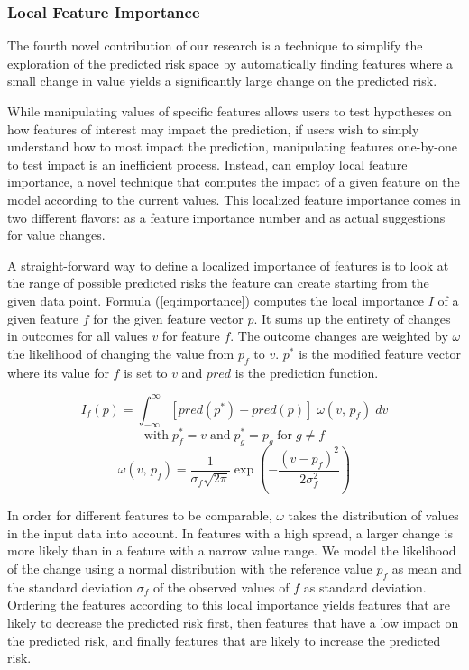 \subsubsection{Local Feature Importance}
The fourth novel contribution of our research is a technique to simplify the
exploration of the predicted risk space by automatically finding features where a small change in value yields a significantly large change on the predicted risk.

While manipulating values of specific features allows users to test hypotheses on how features of interest may impact the prediction, if users wish to simply understand how to most impact the prediction, manipulating features one-by-one to test impact is an inefficient process.  Instead, \prospector can employ local feature importance, a novel technique that computes the impact of a given feature on the model according to the current values.  This localized feature importance comes in two different flavors: as a feature importance number and as actual suggestions for value changes.

A straight-forward way to define a localized importance of features is to look at the range of possible
predicted risks the feature can create starting from the given data point.
Formula (\ref{eq:importance}) computes the local importance $I$ of a given feature $f$ for the given feature
vector $p$. It sums up the entirety of changes in outcomes for all values $v$ for feature $f$.
The outcome changes are weighted by $\omega$ the likelihood of changing the value from $p_f$ to $v$.
$p^{\ast}$ is the modified feature vector where its value for $f$ is set to $v$ and $pred$ is the prediction function.

\begin{equation}
I_{f}(p) = \int_{-\infty}^{\infty}
\left[ pred(p^{\ast}) - pred(p) \right] \; \omega(v, \, p_f) \; dv
\label{eq:importance}
\end{equation}%
\[
\text{with}\; p^{\ast}_{f} = v \;\text{and}\; p^{\ast}_{g} = p_{g} \;\text{for}\; g \neq f
\]\[
\omega(v, \, p_f) = \frac{1}{\sigma_f \sqrt{2\pi}}
\exp \left( -\frac{(v - p_f)^2}{2\sigma_f^2} \right)
\]

In order for different features to be comparable, $\omega$ takes the distribution of values in the input data
into account. In features with a high spread, a larger change is more likely than in a feature with a narrow value range.
We model the likelihood of the change using a normal distribution with the reference value $p_f$ as mean and the
standard deviation $\sigma_f$ of the observed values of $f$ as standard deviation.
Ordering the features according to this local importance yields features that are likely to
decrease the predicted risk first, then features that have a low impact on the predicted risk,
and finally features that are likely to increase the predicted risk.

